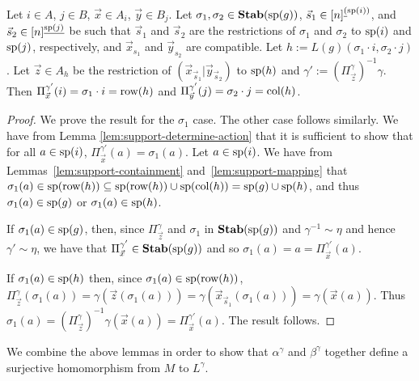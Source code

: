 \documentclass[../main/thesis.tex]{subfiles}
\begin{document}
\begin{lem}
  \label{lem:defining-h-from-IJ}
  Let $i \in A$, $j \in B$, $\vec{x} \in A_i$, $\vec{y} \in B_j$. Let $\sigma_1,
  \sigma_2 \in \text{\textbf{Stab}} (\text{sp} (g))$, $\vec{s}_1 \in [n]^{\underline(\text{sp}(i))}$, and
  $\vec{s}_2 \in [n]^{\underline{\text{sp}(j)}}$ be such that $\vec{s}_1$ and
  $\vec{s}_2$ are the restrictions of $\sigma_1$ and $\sigma_2$ to $\text{sp}(i)$
  and $\text{sp}(j)$, respectively, and $\vec{x}_{s_1}$ and $\vec{y}_{s_2}$ are
  compatible. Let $h := L(g)(\sigma_1 \cdot i, \sigma_2 \cdot j)$. Let $\vec{z}
  \in A_h$ be the restriction of $(\vec{x}_{\vec{s}_1} \vert
  \vec{y}_{\vec{s}_2})$ to $\text{sp}(h)$ and $\gamma' :=
  (\Pi^{\gamma}_{\vec{z}})^{-1} \gamma$. Then $\Pi^{\gamma'}_{\vec{x}}(i) =
  \sigma_1 \cdot i = \text{row} (h)$ and $\Pi^{\gamma'}_{\vec{y}}(j) = \sigma_2 \cdot
  j = \text{col} (h)$.
\end{lem}
\begin{proof}

  We prove the result for the $\sigma_1$ case. The other case follows similarly.
  We have from Lemma \ref{lem:support-determine-action} that it is sufficient to
  show that for all $a \in \text{sp}(i)$, $\Pi^{\gamma'}_{\vec{x}} (a) = \sigma_1
  (a)$. Let $a \in \text{sp}(i)$. We have from Lemmas~\ref{lem:support-containment}
  and~\ref{lem:support-mapping} that $\sigma_1 (a) \in \text{sp}(\text{row}(h)) \subseteq
  \text{sp}(\text{row}(h))\cup \text{sp}(\text{col}(h)) = \text{sp}(g) \cup \text{sp}(h)$, and thus
  $\sigma_1(a) \in \text{sp}(g)$ or $\sigma_1(a) \in \text{sp}(h)$.
  
  If $\sigma_1(a) \in \text{sp}(g)$, then, since $\Pi^{\gamma}_{\vec{z}}$ and
  $\sigma_1$ in $\text{\textbf{Stab}} (\text{sp} (g))$ and $\gamma^{-1} \sim \eta$ and hence $\gamma' \sim
  \eta$, we have that $\Pi^{\gamma'}_{\vec{x}} \in \text{\textbf{Stab}} (\text{sp} (g))$ and so
  $\sigma_1(a) = a = \Pi^{\gamma'}_{\vec{x}}(a)$.

  If $\sigma_1(a) \in \text{sp}(h)$ then, since $\sigma_1(a) \in \text{sp}(\text{row}(h))$,
  $\Pi^{\gamma}_{\vec{z}}(\sigma_1(a)) = \gamma(\vec{z}(\sigma_1(a))) =
  \gamma(\vec{x}_{\vec{s}_1}(\sigma_1(a))) = \gamma (\vec{x}(a))$. Thus
  $\sigma_1 (a) = (\Pi^{\gamma}_{\vec{z}})^{-1}\gamma (\vec{x}(a)) =
  \Pi^{\gamma'}_{\vec{x}}(a)$. The result follows.
\end{proof}

We combine the above lemmas in order to show that $\alpha^{\gamma}$ and
$\beta^{\gamma}$ together define a surjective homomorphism from $M$ to
$L^{\gamma}$.
\end{document}
